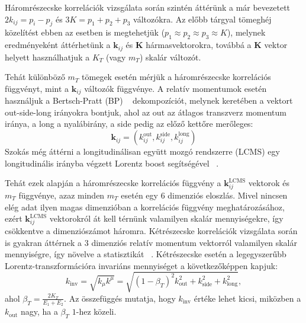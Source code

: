 \documentclass[11pt,a4paper]{article}
\numberwithin{equation}{subsection}
\numberwithin{figure}{section}
\begin{document}
Háromrészecske korrelációk vizsgálata során szintén áttérünk a már bevezetett $2k_{ij}=p_i-p_j$ és  $3K=p_1+p_2+p_3$ változókra. Az előbb tárgyal tömeghéj közelítést ebben az esetben is megtehetjük ($p_1\approx p_2\approx p_3 \approx K$), melynek eredményeként áttérhetünk a $\bm{k}_{ij}$ és $\bm{K}$ hármasvektorokra, továbbá a $\bm{K}$ vektor helyett használhatjuk a $K_T$ (vagy $m_T$) skalár változót.

Tehát különböző $m_T$ tömegek esetén mérjük a háromrészecske korrelációs függvényt, mint a $\bm{k}_{ij}$ változók függvénye. A relatív momentumok esetén használjuk a  Bertsch-Pratt (BP) ~\cite{Pratt:1986ev,Bertsch:1988db} dekompozíciót, melynek keretében a vektort out-side-long irányokra bontjuk, ahol az out az átlagos transzverz momentum iránya, a long a nyalábirány, a side pedig az előző kettőre merőleges:
\begin{equation}
\bm{k}_{ij} = (k_{ij}^{\mathrm{out}}, k_{ij}^{\mathrm{side}}, k_{ij}^{\mathrm{long}})
\end{equation}
 Szokás még áttérni a longitudinálisan együtt mozgó rendszerre (LCMS) egy longitudinális irányba végzett Lorentz boost segítségével ~\cite{Wiedemann:1999qn}.

Tehát ezek alapján a háromrészecske korrelációs függvény a $\bm{k}_{ij}^{\mathrm{LCMS}}$ vektorok és $m_T$ függvénye, azaz minden $m_T$ esetén egy $6$ dimenziós eloszlás. Mivel nincsen elég adat ilyen magas dimenzióban a korrelációs függvény meghatározásához, ezért $\bm{k}_{ij}^{\mathrm{LCMS}}$ vektorokról át kell térnünk valamilyen skalár mennyiségekre, így csökkentve a dimenziószámot háromra. Kétrészecske korrelációk vizsgálata során is gyakran áttérnek a $3$ dimenziós relatív momentum vektorról valamilyen skalár mennyiségre, így növelve a statisztikát ~\cite{Achard:2011zza, Khachatryan:2011hi}. Kétrészecske esetén a legegyszerűbb Lorentz-transzformációra invariáns mennyiséget a következőképpen kapjuk:
\begin{equation}
k_{\mathrm{inv}} = \sqrt{k_\mu k^\mu} = \sqrt{(1-\beta_T)^2k_{\mathrm{out}}^2+k_{\mathrm{side}}^2+k_{\mathrm{long}}^2},
\end{equation}
ahol $\beta_T=\frac{2K_T}{E_1+E_2}$. Az összefüggés mutatja, hogy $k_{\mathrm{inv}}$ értéke lehet kicsi, miközben a $k_{\mathrm{out}}$ nagy, ha a $\beta_T$ $1$-hez közeli.
\end{document}
